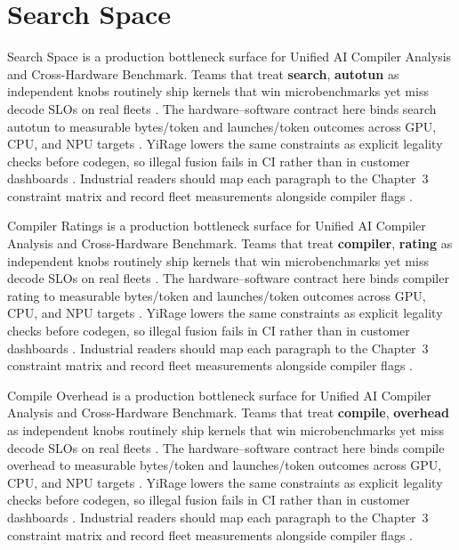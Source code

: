 \section{Search Space}
\label{sec:search_space}

Search Space is a production bottleneck surface for Unified AI Compiler Analysis and Cross-Hardware Benchmark. Teams that treat \textbf{search}, \textbf{autotun} as independent knobs routinely ship kernels that win microbenchmarks yet miss decode SLOs on real fleets \citep{nvidia2022hopper,amd2024aie}. The hardware--software contract here binds search autotun to measurable bytes/token and launches/token outcomes across GPU, CPU, and NPU targets \citep{semianalysis2024tma,dlbook}. YiRage lowers the same constraints as explicit legality checks before codegen, so illegal fusion fails in CI rather than in customer dashboards \citep{amd2024xdna,dao2022flashattention}. Industrial readers should map each paragraph to the Chapter~3 constraint matrix and record fleet measurements alongside compiler flags \citep{amd2024aie,kwon2023vllm}.

Compiler Ratings is a production bottleneck surface for Unified AI Compiler Analysis and Cross-Hardware Benchmark. Teams that treat \textbf{compiler}, \textbf{rating} as independent knobs routinely ship kernels that win microbenchmarks yet miss decode SLOs on real fleets \citep{taxbreak2026,semianalysis2024tma}. The hardware--software contract here binds compiler rating to measurable bytes/token and launches/token outcomes across GPU, CPU, and NPU targets \citep{memoryfloor2026,amd2024xdna}. YiRage lowers the same constraints as explicit legality checks before codegen, so illegal fusion fails in CI rather than in customer dashboards \citep{nvidia2022hopper,amd2024aie}. Industrial readers should map each paragraph to the Chapter~3 constraint matrix and record fleet measurements alongside compiler flags \citep{semianalysis2024tma,dlbook}.

Compile Overhead is a production bottleneck surface for Unified AI Compiler Analysis and Cross-Hardware Benchmark. Teams that treat \textbf{compile}, \textbf{overhead} as independent knobs routinely ship kernels that win microbenchmarks yet miss decode SLOs on real fleets \citep{memoryfloor2026,amd2024xdna}. The hardware--software contract here binds compile overhead to measurable bytes/token and launches/token outcomes across GPU, CPU, and NPU targets \citep{nvidia2022hopper,amd2024aie}. YiRage lowers the same constraints as explicit legality checks before codegen, so illegal fusion fails in CI rather than in customer dashboards \citep{semianalysis2024tma,dlbook}. Industrial readers should map each paragraph to the Chapter~3 constraint matrix and record fleet measurements alongside compiler flags \citep{amd2024xdna,dao2022flashattention}.

